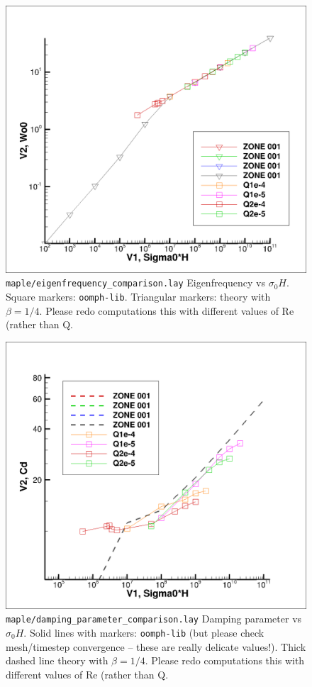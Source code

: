 \documentclass[aps,prl,reprint,superscriptaddress,floatfix]{revtex4-1}
\begin{document}
\begin{figure}[h]
\includegraphics[width=0.99\linewidth]{maple/eigenfrequency_comparison.png}
\caption{\label{eigenfrequency_comparison.png} {\tt maple/eigenfrequency\_comparison.lay} 
Eigenfrequency vs  $\sigma_0 H$. Square markers:
{\tt oomph-lib}. Triangular markers: theory with
$\beta = 1/4$. Please redo computations this with different values of Re (rather
than Q.} 
\end{figure}

\begin{figure}[h]
\includegraphics[width=0.99\linewidth]{maple/damping_parameter_comparison.png}
\caption{\label{damping_parameter_comparison.png} {\tt maple/damping\_parameter\_comparison.lay} 
Damping parameter vs  $\sigma_0 H$. Solid lines with markers:
{\tt oomph-lib} (but please check mesh/timestep convergence -- these
are really delicate values!). Thick dashed line theory with 
$\beta = 1/4$. Please redo computations this with different values of Re (rather
than Q.}
\end{figure}
\end{document}

